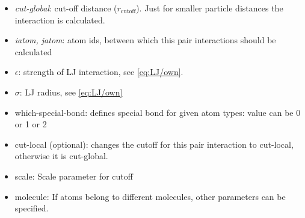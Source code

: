 \documentclass[a4paper,10pt]{scrreprt}
\begin{document}
\begin{itemize}
\item \textit{cut-global}: cut-off distance ($r_\mathrm{cutoff}$). Just for smaller particle distances the interaction is calculated. 
\item \textit{iatom, jatom}: atom ids, between which this pair interactions should be calculated
\item $\epsilon$: strength of LJ interaction, see \cref{eq:LJ/own}.
\item $\sigma$: LJ radius, see \cref{eq:LJ/own}
\item which-special-bond: defines special bond for given atom types: value can be 0 or 1 or 2
\item cut-local (optional): changes the cutoff for this pair interaction to cut-local, otherwise it is cut-global.
\item scale: Scale parameter for cutoff
\item molecule: If atoms belong to different molecules, other parameters can be specified.
\end{itemize}
\end{document}
